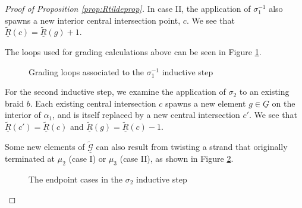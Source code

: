 \documentclass[11pt]{article}
\theoremstyle{plain} \newtheorem{thm}{Theorem}[subsection]
\theoremstyle{plain} \newtheorem{cor}[thm]{Corollary}
\theoremstyle{plain} \newtheorem{prop}[thm]{Proposition}
\theoremstyle{plain} \newtheorem{conj}[thm]{Conjecture}
\theoremstyle{plain} \newtheorem{lem}[thm]{Lemma}
\theoremstyle{definition} \newtheorem{df}[thm]{Definition}
\theoremstyle{remark} \newtheorem{rmk}[thm]{Remark}
\theoremstyle{remark} \newtheorem{obs}[thm]{Observation}
\newcommand{\Gtr}{\underline{G}}
\newcommand{\tld}[1]{\widetilde{#1}}
\newcommand{\Gtil}{\tld{\mathcal{G}}}
\newcommand{\red}[1]{\underline{#1}}
\numberwithin{equation}{section}
\begin{document}
\begin{proof}[Proof of Proposition \ref{prop:Rtildeprop}]
In case II, the application of $\sigma_{1}^{-1}$ also spawns a new interior central intersection point, $c$.  We see that $\red{\tld{R}}(c) = \red{\tld{R}}(g) + 1.$

The loops used for grading calculations above can be seen in Figure \ref{fig:sigma1loops}.

\begin{figure}[h]
\centering
{}\quad
{}
\caption[Grading loops associated to the $\sigma_{1}^{-1}$ inductive step in the proof of Proposition \ref{prop:Rtildeprop}]{Grading loops associated to the $\sigma_{1}^{-1}$ inductive step}
\label{fig:sigma1loops}
\end{figure}

For the second inductive step, we examine the application of $\sigma_{2}$ to an existing braid $b$.  Each existing central intersection $c$ spawns a new element $g \in \Gtr$ on the interior of $\alpha_{1}$, and is itself replaced by a new central intersection $c'$.  We see that $\red{\tld{R}}(c') = \red{\tld{R}}(c)$ and $\red{\tld{R}}(g) = \red{\tld{R}}(c) - 1$.

Some new elements of $\red{\Gtil}$ can also result from twisting a strand that originally terminated at $\mu_{2}$ (case I) or $\mu_{3}$ (case II), as shown in Figure \ref{fig:sigma2cases}.

\begin{figure}[h]
\centering
{}
\caption[The endpoint cases in the $\sigma_{2}$ inductive step in the proof of Proposition \ref{prop:Rtildeprop}]{The endpoint cases in the $\sigma_{2}$ inductive step}
\label{fig:sigma2cases}
\end{figure}


\end{proof}
\end{document}
